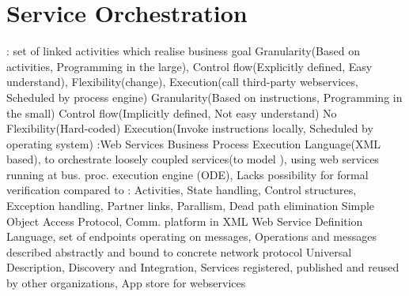 \section{Service Orchestration}
: set of linked activities which realise business goal
Granularity(Based on activities, Programming in the large),
Control flow(Explicitly defined, Easy understand),
Flexibility(change),
Execution(call third-party webservices, Scheduled by process engine)
Granularity(Based on instructions, Programming in the small)
Control flow(Implicitly defined, Not easy understand)
No Flexibility(Hard-coded)
Execution(Invoke instructions locally, Scheduled by operating system)
:Web Services Business Process Execution Language(XML based),
to orchestrate loosely coupled services(to model ),
using web services running at bus. proc. execution engine (ODE),
Lacks possibility for formal verification compared to 
:
Activities,
State handling,
Control structures,
Exception handling,
Partner links,
Parallism,
Dead path elimination
Simple Object Access Protocol,
Comm. platform in XML
Web Service Definition Language,
set of endpoints operating on messages,
Operations and messages described abstractly and bound to concrete network protocol
Universal Description, Discovery and Integration,
Services registered, published and reused by other organizations,
App store for webservices

